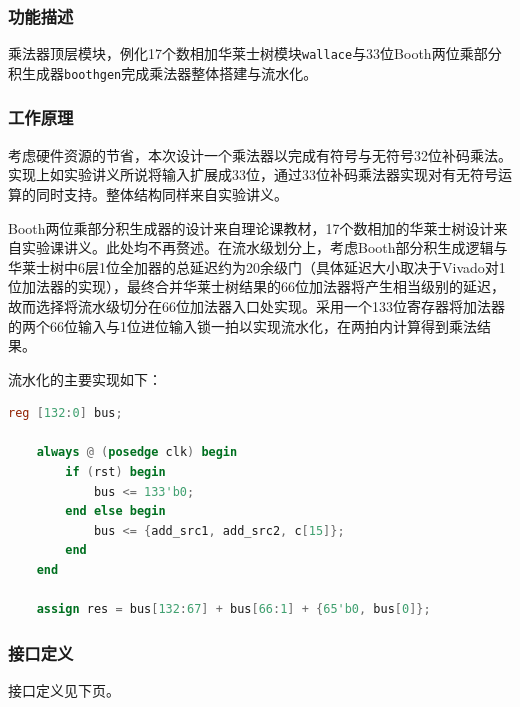 \documentclass[UTF-8,twoside,c5size]{ctexart}
\begin{document}
	\subsubsection{功能描述}
	
	乘法器顶层模块，例化17个数相加华莱士树模块\texttt{wallace}与33位Booth两位乘部分积生成器\texttt{boothgen}完成乘法器整体搭建与流水化。
	
	\subsubsection{工作原理}
	
	考虑硬件资源的节省，本次设计一个乘法器以完成有符号与无符号32位补码乘法。实现上如实验讲义所说将输入扩展成33位，通过33位补码乘法器实现对有无符号运算的同时支持。整体结构同样来自实验讲义。
	
	Booth两位乘部分积生成器的设计来自理论课教材，17个数相加的华莱士树设计来自实验课讲义。此处均不再赘述。在流水级划分上，考虑Booth部分积生成逻辑与华莱士树中6层1位全加器的总延迟约为20余级门（具体延迟大小取决于Vivado对1位加法器的实现），最终合并华莱士树结果的66位加法器将产生相当级别的延迟，故而选择将流水级切分在66位加法器入口处实现。采用一个133位寄存器将加法器的两个66位输入与1位进位输入锁一拍以实现流水化，在两拍内计算得到乘法结果。
	
	流水化的主要实现如下：
	\begin{lstlisting}[language=verilog]
	reg [132:0] bus;
	
	always @ (posedge clk) begin
		if (rst) begin
			bus <= 133'b0;
		end else begin
			bus <= {add_src1, add_src2, c[15]};
		end
	end
	
	assign res = bus[132:67] + bus[66:1] + {65'b0, bus[0]};\end{lstlisting}
	
	\subsubsection{接口定义}
	
	接口定义见下页。
	
\end{document}
